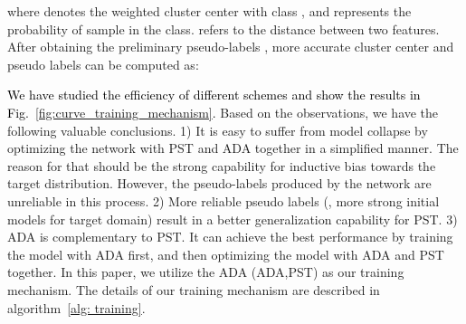 \documentclass[journal]{IEEEtran}
\newcommand{\tcb}{\textcolor{black}}
\begin{document}
where  denotes the weighted cluster center with class , and  represents the probability of  sample  in the  class.  refers to the distance between two features. After obtaining the preliminary pseudo-labels , more accurate cluster center  and pseudo labels  can be computed as:

\tcb{We have studied the efficiency of different schemes and show the results in Fig.~\ref{fig:curve_training_mechanism}.} Based on the observations, we have the following valuable conclusions. 1) It is easy to suffer from model collapse by optimizing the network with PST and ADA together in a simplified manner. The reason for that should be the strong capability for inductive bias towards the target distribution. However, the pseudo-labels produced by the network are unreliable in this process.
2) More reliable pseudo labels (\ieno, more strong initial models for target domain) result in a better generalization capability for PST.
3) ADA is complementary to PST. It can achieve the best performance by training the model with ADA first, and then optimizing the model with ADA and PST together. 
In this paper, we utilize the ADA  (ADA,PST) as our training mechanism. The details of our training mechanism are described in algorithm~\ref{alg: training}.
\end{document}
